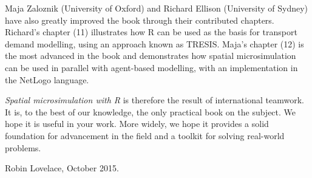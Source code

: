 Maja Zaloznik
(University of Oxford)
and Richard Ellison (University of Sydney) have also greatly improved the book
through their contributed chapters.
Richard's chapter (11) illustrates how R can be used as the basis for transport
demand modelling, using an approach known as TRESIS. Maja's chapter (12)
is the most advanced in the book and demonstrates how spatial microsimulation
can be used in parallel with agent-based modelling, with an implementation in the
NetLogo language.



\emph{Spatial microsimulation with R} is therefore the
result of international teamwork.
It is, to the best of our knowledge, the only practical book on the subject.
We hope it is useful in your work.
More widely, we hope it provides
a solid foundation for advancement in the
field and a toolkit for solving real-world problems.


Robin Lovelace, October 2015.




